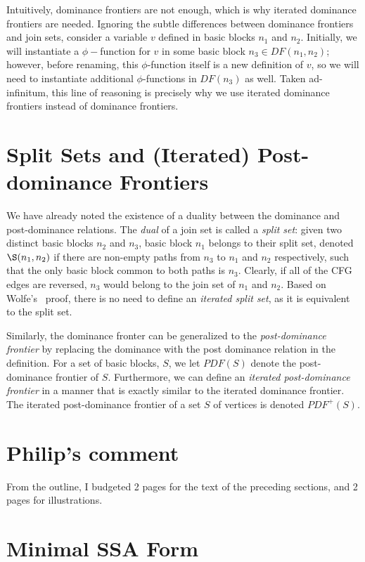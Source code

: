Intuitively, dominance frontiers are not enough, which is why
iterated dominance frontiers are needed. Ignoring the subtle
differences between dominance frontiers and join sets, consider
a variable $v$ defined in basic blocks $n_{1}$ and $n_{2}$. Initially,
we will instantiate a $\phi-$function for $v$ in some basic block
$n_{3} \in DF(n_{1}, n_{2})$; however, before renaming, this
$\phi$-function itself is a new definition of $v$, so we will need
to instantiate additional $\phi$-functions in $DF(n_{3})$ as well.
Taken ad-infinitum, this line of reasoning is precisely why we
use iterated dominance frontiers instead of dominance frontiers. 

\section{Split Sets and (Iterated) Post-dominance Frontiers}

We have already noted the existence of a duality between the 
dominance and post-dominance relations. The \emph{dual} of
a join set is called a \emph{split set}: given two distinct
basic blocks $n_{2}$ and $n_{3}$, basic block $n_{1}$ belongs
to their split set, denoted $\S(n_{1}, n_{2})$ if there 
are non-empty paths from $n_{3}$ to $n_{1}$ and $n_{2}$
respectively, such that the only basic block common to both
paths is $n_{3}$. Clearly, if all of the CFG edges are
reversed, $n_{3}$ would belong to the join set of $n_{1}$
and $n_{2}$. Based on Wolfe's~\cite{WolfeJul94} proof,
there is no need to define an \emph{iterated split set}, 
as it is equivalent to the split set. 

Similarly, the dominance fronter can be generalized 
to the \emph{post-dominance frontier} by replacing the
dominance with the post dominance relation in the definition.
For a set of basic blocks, $S$, we let $PDF(S)$ denote
the post-dominance frontier of $S$. Furthermore, we can
define an \emph{iterated post-dominance frontier} in a 
manner that is exactly similar to the iterated dominance
frontier. The iterated post-dominance frontier of a set
$S$ of vertices is denoted $PDF^{+}(S)$. 


\section{Philip's comment}

From the outline, I budgeted 2 pages for the text of
the preceding sections, and 2 pages for illustrations.


\section{Minimal SSA Form}

